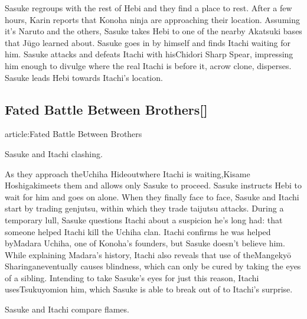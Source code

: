 \documentclass[a4paper,12pt]{article}
\begin{document}
Sasuke regroups with the rest of Hebi and they find a place to rest. After a few hours, Karin reports that Konoha ninja are approaching their location. Assuming it's Naruto and the others, Sasuke takes Hebi to one of the nearby Akatsuki bases that Jūgo learned about. Sasuke goes in by himself and finds Itachi waiting for him. Sasuke attacks and defeats Itachi with hisChidori Sharp Spear, impressing him enough to divulge where the real Itachi is before it, acrow clone, disperses. Sasuke leads Hebi towards Itachi's location.\\ \par \vspace{0.5cm}

\subsection*{Fated Battle Between Brothers[]}\n\nMain article:Fated Battle Between Brothers\\ \par \vspace{0.5cm}

Sasuke and Itachi clashing.\\ \par \vspace{0.5cm}

As they approach theUchiha Hideoutwhere Itachi is waiting,Kisame Hoshigakimeets them and allows only Sasuke to proceed. Sasuke instructs Hebi to wait for him and goes on alone. When they finally face to face, Sasuke and Itachi start by trading genjutsu, within which they trade taijutsu attacks. During a temporary lull, Sasuke questions Itachi about a suspicion he's long had: that someone helped Itachi kill the Uchiha clan. Itachi confirms he was helped byMadara Uchiha, one of Konoha's founders, but Sasuke doesn't believe him. While explaining Madara's history, Itachi also reveals that use of theMangekyō Sharinganeventually causes blindness, which can only be cured by taking the eyes of a sibling. Intending to take Sasuke's eyes for just this reason, Itachi usesTsukuyomion him, which Sasuke is able to break out of to Itachi's surprise.\\ \par \vspace{0.5cm}

Sasuke and Itachi compare flames.\\ \par \vspace{0.5cm}
\end{document}

